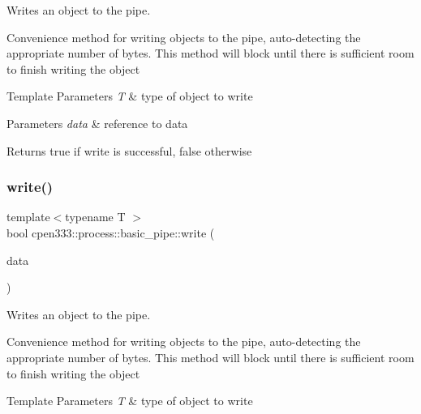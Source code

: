Writes an object to the pipe. 

Convenience method for writing objects to the pipe, auto-\/detecting the appropriate number of bytes. This method will block until there is sufficient room to finish writing the object


\begin{DoxyTemplParams}{Template Parameters}
{\em T} & type of object to write \\
\hline
\end{DoxyTemplParams}

\begin{DoxyParams}{Parameters}
{\em data} & reference to data \\
\hline
\end{DoxyParams}
\begin{DoxyReturn}{Returns}
true if write is successful, false otherwise 
\end{DoxyReturn}
\mbox{\label{classcpen333_1_1process_1_1basic__pipe_a31a394d2126fdcf8cfaace1733f941ff}} 
\subsubsection{\texorpdfstring{write()}{write()}\hspace{0.1cm}{\footnotesize\ttfamily [3/3]}}
{\footnotesize\ttfamily template$<$typename T $>$ \\
bool cpen333\+::process\+::basic\+\_\+pipe\+::write (\begin{DoxyParamCaption}\item[{const T $\ast$}]{data }\end{DoxyParamCaption})\hspace{0.3cm}{\ttfamily [inline]}}



Writes an object to the pipe. 

Convenience method for writing objects to the pipe, auto-\/detecting the appropriate number of bytes. This method will block until there is sufficient room to finish writing the object


\begin{DoxyTemplParams}{Template Parameters}
{\em T} & type of object to write \\
\hline
\end{DoxyTemplParams}

